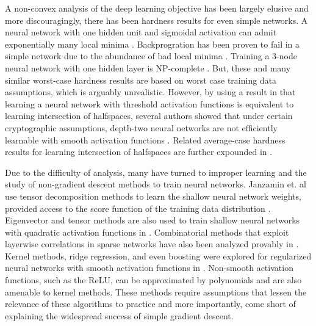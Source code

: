 \documentclass{article}
\begin{document}
A non-convex analysis of the deep learning objective has been largely elusive and more discouragingly, there has been hardness results for even simple networks. A neural network with one hidden unit and sigmoidal activation can admit exponentially many local minima \cite{Auer}. Backprogration has been proven to fail in a simple network due to the abundance of bad local minima \cite{brady1989back}. Training a 3-node neural network with one hidden layer is { NP}-complete \cite{BlumR88}.  But, these and many similar worst-case hardness results are based on worst case training data assumptions, which is arguably unrealistic. However, by using a result in \cite{klivans2006cryptographic} that learning a neural network with threshold activation functions is equivalent to learning intersection of halfspaces, several authors showed that under certain cryptographic assumptions, depth-two neural networks are not efficiently learnable with smooth activation functions \cite{LivniSS14} \cite{ZhangLWJ15}\cite{ZhangLJ15}. Related average-case hardness results for learning intersection of halfspaces are further expounded in \cite{daniely2014average}.

Due to the difficulty of analysis, many have turned to improper learning and the study of non-gradient descent methods to train neural networks. Janzamin et. al use tensor decomposition methods to learn the shallow neural network weights, provided access to the score function of the training data distribution \cite{JanzaminSA15}. Eigenvector and tensor methods are also used to train shallow neural networks with quadratic activation functions in \cite{LivniSS14}. Combinatorial methods that exploit layerwise correlations in sparse networks have also been analyzed provably in \cite{AroraBGM13}. Kernel methods, ridge regression, and even boosting were explored for regularized neural networks with smooth activation functions in \cite{shalev2011learning}\cite{ZhangLWJ15}\cite{ZhangLJ15}. Non-smooth activation functions, such as the ReLU, can be approximated by polynomials and are also amenable to kernel methods\cite{GoelKKT16}. These methods require assumptions that lessen the relevance of these algorithms to practice and more importantly, come short of explaining the widespread success of simple gradient descent.
\end{document}
